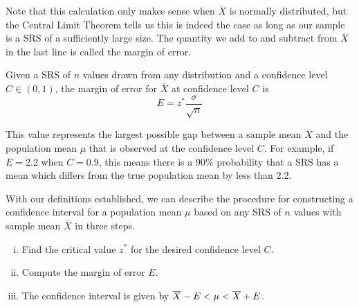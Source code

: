 \par
Note that this calculation only makes sense when $\overline{X}$ is normally distributed, but the Central Limit Theorem tells us this is indeed the case as long as our sample is a SRS of a sufficiently large size. The quantity we add to and subtract from $\overline{X}$ in the last line is called the margin of error.
\begin{defn} Given a SRS of $n$ values drawn from any distribution and a confidence level $C \in (0,1)$, the margin of error for $\overline{X}$ at confidence level $C$ is 
$$\boxed{E = z^* \frac{\sigma}{\sqrt{n}}}$$
\end{defn}
\par
This value represents the largest possible gap between a sample mean $\overline{X}$ and the population mean $\mu$ that is observed at the confidence level $C$. For example, if $E = 2.2$ when $C = 0.9$, this means there is a $90\%$ probability that a SRS has a mean which differs from the true population mean by less than $2.2$.
\par
With our definitions established, we can describe the procedure for constructing a confidence interval for a population mean $\mu$ based on any SRS of $n$ values with sample mean $\overline{X}$ in three steps.
\begin{enumerate}[(i)]
\item Find the critical value $z^*$ for the desired confidence level $C$.
\item Compute the margin of error $E$.
\vspace*{-0.02in}
\item The confidence interval is given by ${\overline{X}} - E < \mu < {\overline{X}} + E$.
\end{enumerate}
